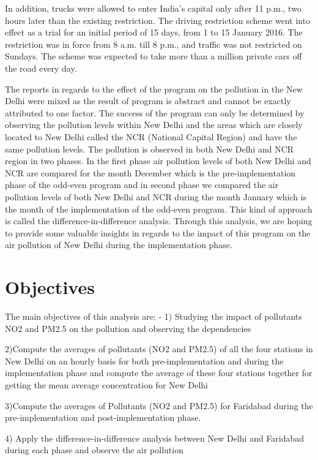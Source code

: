 \documentclass{acm_proc_article-sp}
\begin{document}
In addition, trucks were allowed to enter India's capital only after 11 p.m., two hours later than the existing restriction. The driving restriction scheme went into effect as a trial for an initial period of 15 days, from 1 to 15 January 2016. The restriction was in force from 8 a.m. till 8 p.m., and traffic was not restricted on Sundays. The scheme was expected to take more than a million private cars off the 
road every day.\cite{RoadSpaceRationing}

 

The reports in regards to the effect of the program on the pollution in the New Delhi were mixed as the result of program is abstract and cannot be exactly attributed to one factor. The success of the program can only be determined by observing the pollution levels within New Delhi and the areas which are closely located to New Delhi called the NCR (National Capital Region) and have the same pollution levels. The pollution is observed in both New Delhi and NCR region in two phases. In the first phase air pollution levels of both New Delhi and NCR are compared for the month December which is the pre-implementation phase of the odd-even program and in second phase we compared the air pollution levels of both New Delhi and NCR during the month January which is the month of the implementation of the odd-even program. This kind of approach is called the difference-in-difference analysis. Through this analysis, we are hoping to provide some valuable insights in regards to the impact of this program on the air pollution of New Delhi during the implementation phase.  

\section{Objectives}
The main objectives of this analysis are: -
1) Studying the impact of pollutants NO2 and PM2.5 on the pollution and observing the dependencies

2)Compute the averages of pollutants (NO2 and PM2.5) of all the four stations in New Delhi on an hourly basis for both pre-implementation and during the implementation phase and compute the average of these four stations together for getting the mean average concentration for New Delhi

3)Compute the averages of Pollutants (NO2 and PM2.5) for Faridabad
during the pre-implementation and post-implementation phase.


4) Apply the difference-in-difference analysis between New Delhi and Faridabad during each phase and observe the air pollution
\end{document}
